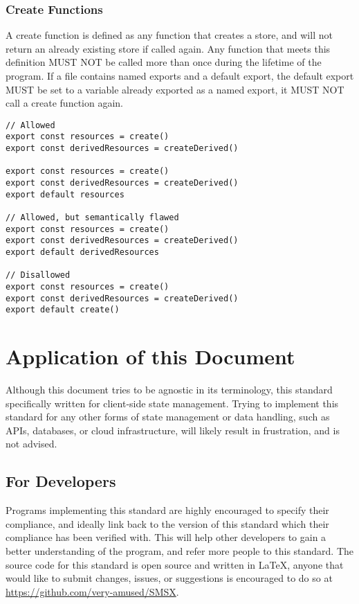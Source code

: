 \documentclass{article}
\begin{document}
\subsubsection{Create Functions}
A create function is defined as any function that creates a store, and will not return an already existing store if called again. Any function that meets this definition MUST NOT be called more than once during the lifetime of the program. If a file contains named exports and a default export, the default export MUST be set to a variable already exported as a named export, it MUST NOT call a create function again. 

\begin{lstlisting}[caption=Usage of Create Functions and Named Exports]
// Allowed
export const resources = create()
export const derivedResources = createDerived()

export const resources = create()
export const derivedResources = createDerived()
export default resources

// Allowed, but semantically flawed
export const resources = create()
export const derivedResources = createDerived()
export default derivedResources

// Disallowed
export const resources = create()
export const derivedResources = createDerived()
export default create()
\end{lstlisting}

\newpage
\section{Application of this Document}
Although this document tries to be agnostic in its terminology, this standard specifically written for client-side state management. Trying to implement this standard for any other forms of state management or data handling, such as APIs, databases, or cloud infrastructure, will likely result in frustration, and is not advised. 

\subsection{For Developers}
Programs implementing this standard are highly encouraged to specify their compliance, and ideally link back to the version of this standard which their compliance has been verified with. This will help other developers to gain a better understanding of the program, and refer more people to this standard. The source code for this standard is open source and written in \LaTeX{}, anyone that would like to submit changes, issues, or suggestions is encouraged to do so at \url{https://github.com/very-amused/SMSX}.
\end{document}
